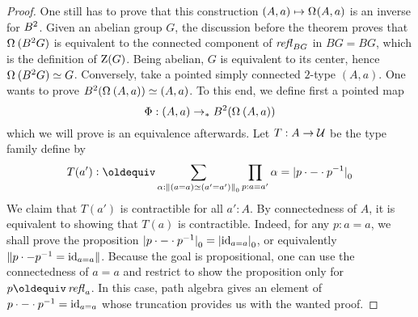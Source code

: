 \begin{proof}
  One still has to prove that this construction
  $(A,a) \mapsto \loopspace (A,a)$ is an inverse for $B^2$. Given an
  abelian group $G$, the discussion before the theorem proves that
  $\loopspace {(\BB G)}$ is equivalent to the connected component of
  $\mathop{\mathit{refl}_{BG}}$ in $BG=BG$, which is the definition of
  $\operatorname{Z}(G)$. Being abelian, $G$ is equivalent to its center,
  hence $\loopspace {(\BB G)} \simeq G$. Conversely, take a pointed
  simply connected $2$-type $(A,a)$. One wants to prove
  $\BB (\loopspace {(A,a)}) \weq (A,a)$. To this end, we define first
  a pointed map
  \begin{displaymath}
    \Phi : (A,a) \ptdto \BB {(\loopspace {(A,a)})}
  \end{displaymath}
  which we will prove is an equivalence afterwards.
  Let $T : A \to \mathcal{U}$ be the type family define by
  \begin{displaymath}
    T(a') \defequi \sum_{\alpha:\setTrunc{(a=a)\weq(a'=a')}}\prod_{p:a=a'}
    \alpha = \settrunc{p\cdot \blank \cdot \inv p}
  \end{displaymath}
  We claim that $T(a')$ is contractible for all $a':A$. By
  connectedness of $A$, it is equivalent to showing that $T(a)$ is
  contractible. Indeed, for any $p:a=a$, we shall prove the
  proposition
  ${\lvert p\cdot {-} \cdot p^{-1}\rvert}_0 = {\lvert\mathord{\mathrm{id}}_{a=a}\rvert}_0$, or
  equivalently $\lVert p\cdot{-}p^{-1} = \mathord{\mathrm{id}}_{a=a}\rVert$. Because the
  goal is propositional, one can use the connectedness of $a=a$ and
  restrict to show the proposition only for $p \jdeq \refl a$. In this
  case, path algebra gives an element of
  $p\cdot{-} \cdot p^{-1} = \mathord{\mathrm{id}}_{a=a}$ whose truncation provides us
  with the wanted proof.

\end{proof}
